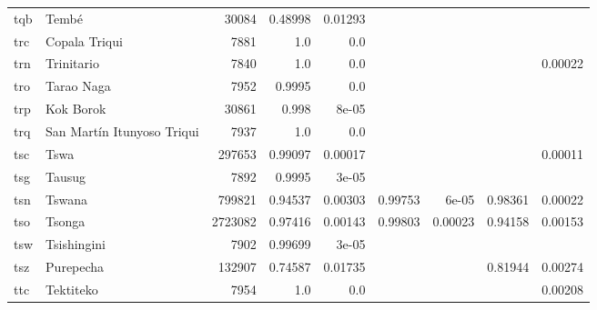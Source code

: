 \documentclass[11pt]{article}
\begin{document}
\begin{table*}[h]
{\begin{tabular}{llrrrrrrr}
tqb         & Tembé         & 30084         & 0.48998         & 0.01293         &          &          &          &          \\

trc         & Copala Triqui         & 7881         & 1.0         & 0.0         &          &          &          &          \\

trn         & Trinitario         & 7840         & 1.0         & 0.0         &          &          &          & 0.00022         \\

tro         & Tarao Naga         & 7952         & 0.9995         & 0.0         &          &          &          &          \\

trp         & Kok Borok         & 30861         & 0.998         & 8e-05         &          &          &          &          \\

trq         & San Martín Itunyoso Triqui         & 7937         & 1.0         & 0.0         &          &          &          &          \\

tsc         & Tswa         & 297653         & 0.99097         & 0.00017         &          &          &          & 0.00011         \\

tsg         & Tausug         & 7892         & 0.9995         & 3e-05         &          &          &          &          \\

tsn         & Tswana         & 799821         & 0.94537         & 0.00303         & 0.99753         & 6e-05         & 0.98361         & 0.00022         \\

tso         & Tsonga         & 2723082         & 0.97416         & 0.00143         & 0.99803         & 0.00023         & 0.94158         & 0.00153         \\

tsw         & Tsishingini         & 7902         & 0.99699         & 3e-05         &          &          &          &          \\

tsz         & Purepecha         & 132907         & 0.74587         & 0.01735         &          &          & 0.81944         & 0.00274         \\

ttc         & Tektiteko         & 7954         & 1.0         & 0.0         &          &          &          & 0.00208         \\


\end{tabular}}
\end{table*}
\end{document}
